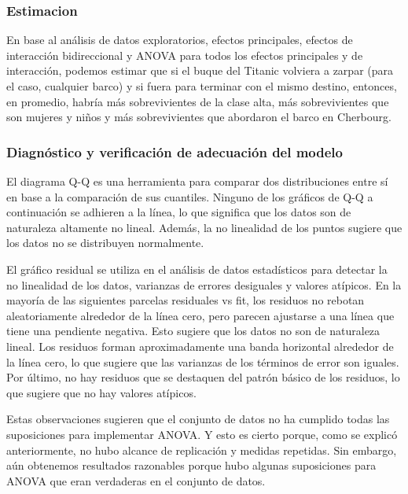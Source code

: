\documentclass[]{article}
\begin{document}
\subsubsection{Estimacion}\label{estimacion}

En base al análisis de datos exploratorios, efectos principales, efectos
de interacción bidireccional y ANOVA para todos los efectos principales
y de interacción, podemos estimar que si el buque del Titanic volviera a
zarpar (para el caso, cualquier barco) y si fuera para terminar con el
mismo destino, entonces, en promedio, habría más sobrevivientes de la
clase alta, más sobrevivientes que son mujeres y niños y más
sobrevivientes que abordaron el barco en Cherbourg.

\subsubsection{Diagnóstico y verificación de adecuación del
modelo}\label{diagnostico-y-verificacion-de-adecuacion-del-modelo}

El diagrama Q-Q es una herramienta para comparar dos distribuciones
entre sí en base a la comparación de sus cuantiles. Ninguno de los
gráficos de Q-Q a continuación se adhieren a la línea, lo que significa
que los datos son de naturaleza altamente no lineal. Además, la no
linealidad de los puntos sugiere que los datos no se distribuyen
normalmente.

El gráfico residual se utiliza en el análisis de datos estadísticos para
detectar la no linealidad de los datos, varianzas de errores desiguales
y valores atípicos. En la mayoría de las siguientes parcelas residuales
vs fit, los residuos no rebotan aleatoriamente alrededor de la línea
cero, pero parecen ajustarse a una línea que tiene una pendiente
negativa. Esto sugiere que los datos no son de naturaleza lineal. Los
residuos forman aproximadamente una banda horizontal alrededor de la
línea cero, lo que sugiere que las varianzas de los términos de error
son iguales. Por último, no hay residuos que se destaquen del patrón
básico de los residuos, lo que sugiere que no hay valores atípicos.

Estas observaciones sugieren que el conjunto de datos no ha cumplido
todas las suposiciones para implementar ANOVA. Y esto es cierto porque,
como se explicó anteriormente, no hubo alcance de replicación y medidas
repetidas. Sin embargo, aún obtenemos resultados razonables porque hubo
algunas suposiciones para ANOVA que eran verdaderas en el conjunto de
datos.
\end{document}
